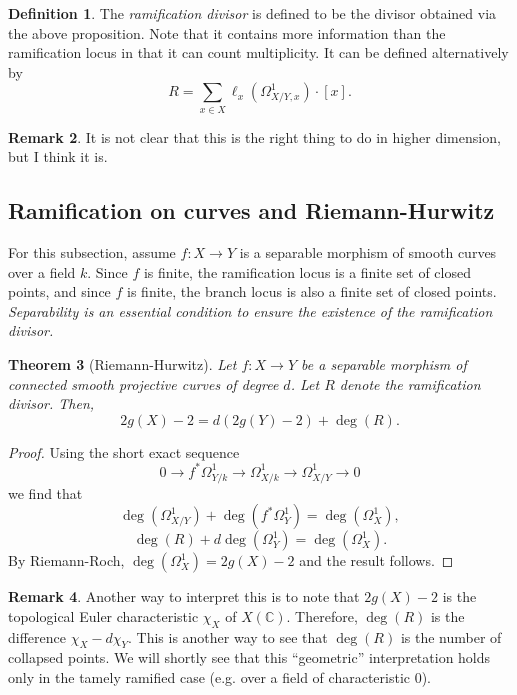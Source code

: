 \documentclass[10pt]{article}
\newtheorem{thm}{Theorem}[section]
\theoremstyle{definition}
\newtheorem{defn}[thm]{Definition}
\newtheorem{rmk}[thm]{Remark}
\newcommand{\C}{\mathbb{C}}
\begin{document}
\begin{defn}
The \emph{ramification divisor} is defined to be the divisor obtained via the above proposition.  Note that it contains more information than the ramification locus in that it can count multiplicity.  It can be defined alternatively by
$$R = \sum_{x \in X} \ell_x(\Omega^1_{X/Y, x}) \cdot [x].$$
\end{defn}


\begin{rmk}
It is not clear that this is the right thing to do in higher dimension, but I think it is.
\end{rmk}

\subsection{Ramification on curves and Riemann-Hurwitz}

For this subsection, assume $f: X \rightarrow Y$ is a separable morphism of smooth curves over a field $k$. Since $f$ is finite, the ramification locus is a finite set of closed points, and since $f$ is finite, the branch locus is also a finite set of closed points.  \emph{Separability is an essential condition to ensure the existence of the ramification divisor.}




\begin{thm}[Riemann-Hurwitz]
Let $f: X \rightarrow Y$ be a separable morphism of connected smooth projective curves of degree $d$.  Let $R$ denote the ramification divisor.  Then,
$$2g(X) - 2 = d(2g(Y) - 2) + \deg(R).$$
\end{thm}
\begin{proof}
Using the short exact sequence
$$0 \rightarrow f^* \Omega^1_{Y/k} \rightarrow \Omega^1_{X/k} \rightarrow \Omega^1_{X/Y} \rightarrow 0$$
we find that 
$$\deg(\Omega^1_{X/Y}) + \deg(f^* \Omega^1_Y) = \deg(\Omega^1_X),$$  
$$\deg(R) + d \deg(\Omega^1_Y) = \deg(\Omega^1_X).$$
By Riemann-Roch, $\deg(\Omega^1_X) = 2g(X) - 2$ and the result follows.
\end{proof}

\begin{rmk}
Another way to interpret this is to note that $2g(X) - 2$ is the topological Euler characteristic $\chi_X$ of $X(\C)$.  Therefore, $\deg(R)$ is the difference $\chi_X - d \chi_Y$.  This is another way to see that $\deg(R)$ is the number of collapsed points.  We will shortly see that this ``geometric'' interpretation holds only in the tamely ramified case (e.g. over a field of characteristic 0).
\end{rmk}
\end{document}
